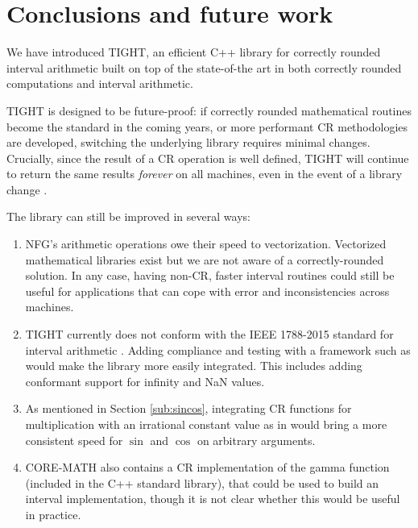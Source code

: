 
\section{Conclusions and future work}
We have introduced TIGHT, an efficient C++ library for correctly rounded interval arithmetic built on top of the state-of-the art in both correctly rounded computations and interval arithmetic.

TIGHT is designed to be future-proof: if correctly rounded mathematical routines become the standard in the coming years, or more performant CR methodologies are developed, switching the underlying library requires minimal changes.
Crucially, since the result of a CR operation is well defined, TIGHT will continue to return the same results \emph{forever} on all machines, even in the event of a library change
.

The library can still be improved in several ways:
\begin{enumerate}
	\item NFG's arithmetic operations owe their speed to vectorization. Vectorized mathematical libraries exist \cite{sleef} but we are not aware of a correctly-rounded solution. In any case, having non-CR, faster interval routines could still be useful for applications that can cope with error and inconsistencies across machines.
	\item TIGHT currently does not conform with the IEEE 1788-2015 standard for interval arithmetic \cite{ieee1788}. Adding compliance and testing with a framework such as \cite{Benet23} would make the library more easily integrated. This includes adding conformant support for infinity and NaN values.
	\item As mentioned in Section \ref{sub:sincos}, integrating CR functions for multiplication with an irrational constant value as in \cite{Brisebarre:2005} would bring a more consistent speed for $\sin$ and $\cos$ on arbitrary arguments.
	\item CORE-MATH also contains a CR implementation of the gamma function (included in the C++ standard library), that could be used to build an interval implementation, though it is not clear whether this would be useful in practice.
\end{enumerate}

